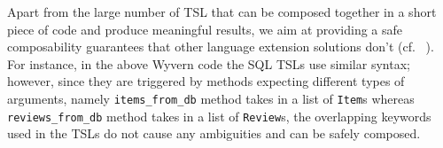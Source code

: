 Apart from the large number of TSL that can be composed together in a short piece of code and produce meaningful results, we aim at providing a safe composability guarantees that other language extension solutions don't (cf.~\cite{Erdweg:2013:FEL:2517208.2517210} ). For instance, in the above Wyvern code the SQL TSLs use similar syntax; however, since they are triggered by methods expecting different types of arguments, namely \lstinline{items_from_db} method takes in a list of \lstinline{Item}s whereas \lstinline{reviews_from_db} method takes in a list of \lstinline{Review}s, the overlapping keywords used in the TSLs do not cause any ambiguities and can be safely composed.

%
%
%
